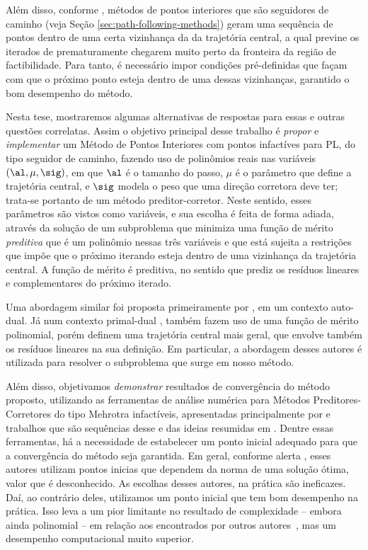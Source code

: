 Além disso, conforme \textcite{Hung:1996br}, métodos de pontos interiores que são seguidores de caminho (veja Seção \ref{sec:path-following-methods}) geram uma sequência de pontos dentro de uma certa vizinhança da da trajetória central, a qual previne os iterados de prematuramente chegarem muito perto da fronteira da região de factibilidade. Para tanto, é necessário impor condições pré-definidas que façam com que o próximo ponto esteja dentro de uma dessas vizinhanças, garantido  o bom desempenho do método. 




Nesta tese, mostraremos algumas alternativas de respostas para  essas e outras questões correlatas. Assim o objetivo principal desse trabalho é \emph{propor} e \emph{implementar} um Método de Pontos Interiores com pontos infactíves para \ac{PL}, do tipo seguidor de caminho, fazendo  uso de polinômios reais nas variáveis $(\al,\mu,\sig)$, em que $\al$ é o tamanho do passo, $\mu$ é o parâmetro que define a trajetória central, e $\sig$ modela o peso que uma direção corretora deve ter; trata-se portanto de um método preditor-corretor. Neste sentido, esses parâmetros são vistos como variáveis, e sua escolha é feita de forma adiada, através da solução de um subproblema que minimiza uma função de mérito \emph{preditiva} que é um polinômio nessas três variáveis e que está sujeita a restrições que impõe que o próximo iterando esteja dentro de uma vizinhança da trajetória central. A função de mérito é preditiva, no sentido que prediz os resíduos lineares e complementares do próximo iterado.


Uma abordagem similar foi proposta primeiramente por \textcite{VillasBoas:2003tg}, em um contexto auto-dual. Já num contexto primal-dual \textcite{VillasBoas:2012ur,VillasBoas2013:wn}, também fazem uso de uma função de mérito polinomial, porém definem uma trajetória central mais geral, que envolve também os resíduos lineares na sua definição.  Em particular, a abordagem desses autores é utilizada para resolver o subproblema que surge em nosso método.

Além disso, objetivamos \emph{demonstrar} resultados de convergência do método proposto, utilizando as ferramentas de análise numérica para Métodos Preditores-Corretores do tipo Mehrotra infactíveis, apresentadas principalmente por \textcite{Zhang:2006ic} e trabalhos que são sequências desse e das ideias resumidas em \textcite[cap. 7]{Wright:Primal-dual-interior-point:1997h}. Dentre essas ferramentas, há a necessidade de estabelecer um ponto inicial adequado para que a convergência do método seja garantida. Em geral, conforme alerta \textcite[p. 112]{Wright:Primal-dual-interior-point:1997h}, esses autores utilizam pontos inicias que dependem da norma de uma solução ótima, valor que é desconhecido. As escolhas desses autores, na prática são ineficazes. 
Daí, ao contrário deles, utilizamos um ponto inicial que tem bom desempenho na prática. Isso leva a um pior limitante no resultado de complexidade -- embora ainda polinomial -- em relação aos encontrados por outros autores~\cite{Zhang:1995fu,Zhang:2006ic,Wright:1993je,Wright:1996kj}, mas um desempenho computacional muito superior. 







